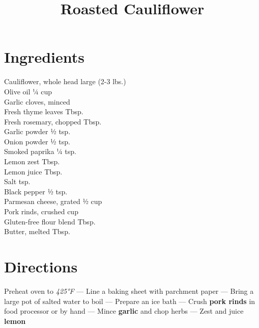 \documentclass[11pt,letterpaper]{article}
\title{Roasted Cauliflower}
\author{}
\date{}
\begin{document}
\maketitle
\thispagestyle{empty}

\section*{Ingredients}
\setlength{\columnsep}{20pt}
\begin{multicols}{2}
\noindent
    Cauliflower, whole head  large (2-3 lbs.) \\
    Olive oil \dotfill ¼ cup \\
    Garlic cloves, minced  \\
    Fresh thyme leaves  Tbsp. \\
    Fresh rosemary, chopped  Tbsp. \\
    Garlic powder \dotfill ½ tsp. \\
    Onion powder \dotfill ½ tsp. \\
    Smoked paprika \dotfill ¼ tsp. \\
    \columnbreak
    Lemon zest  Tbsp. \\
    Lemon juice  Tbsp. \\
    Salt  tsp. \\
    Black pepper \dotfill ½ tsp. \\
    Parmesan cheese, grated \dotfill ½ cup \\
    Pork rinds, crushed  cup \\
    Gluten-free flour blend  Tbsp. \\
    Butter, melted  Tbsp. \\
\end{multicols}

\section*{Directions}

\noindent
Preheat oven to \textit{425°F} ---
Line a baking sheet with parchment paper ---
Bring a large pot of salted water to boil ---
Prepare an ice bath ---
Crush \textbf{pork rinds} in food processor or by hand ---
Mince \textbf{garlic} and chop herbs ---
Zest and juice \textbf{lemon}
\end{document}
